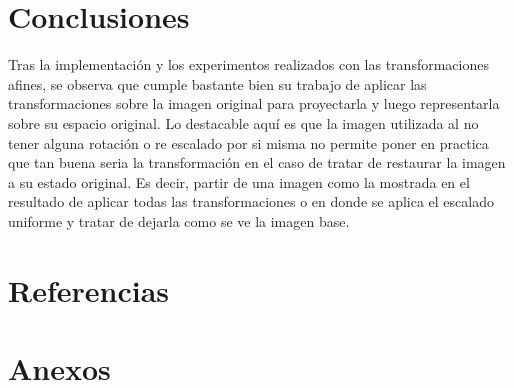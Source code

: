 \documentclass[11pt, letterpaper]{article}
\begin{document}
\newpage
	
\section{Conclusiones}
	
Tras la implementación y los experimentos realizados con las transformaciones afines, se observa que cumple bastante bien su trabajo de aplicar las transformaciones sobre la imagen original para proyectarla y luego representarla sobre su espacio original. Lo destacable aquí es que la imagen utilizada al no tener alguna rotación o re escalado por si misma no permite poner en practica que tan buena seria la transformación en el caso de tratar de restaurar la imagen a su estado original. Es decir, partir de una imagen como la mostrada en el resultado de aplicar todas las transformaciones o en donde se aplica el escalado uniforme y tratar de dejarla como se ve la imagen base.
\newpage

	
\section{Referencias}  %

\newpage
	
\section{Anexos}	
\end{document}
